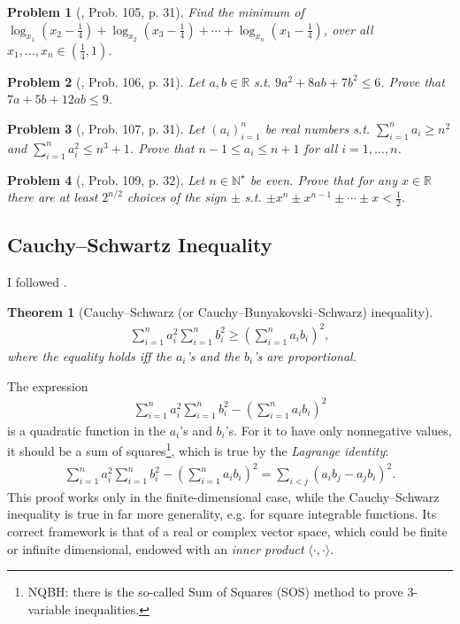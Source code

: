 \documentclass[oneside]{book}
\numberwithin{equation}{section}
\newtheorem{theorem}{Theorem}[section]
\newtheorem{problem}{Problem}[section]
\begin{document}
\begin{problem}[\cite{Gelca_Andreescu2017}, Prob. 105, p. 31]
	Find the minimum of $\log_{x_1}\left(x_2 - \frac{1}{4}\right) + \log_{x_2}\left(x_3 - \frac{1}{4}\right) + \cdots + \log_{x_n}\left(x_1 - \frac{1}{4}\right)$, over all $x_1,\ldots,x_n\in\left(\frac{1}{4},1\right)$.
\end{problem}

\begin{problem}[\cite{Gelca_Andreescu2017}, Prob. 106, p. 31]
	Let $a,b\in\mathbb{R}$ s.t. $9a^2 + 8ab + 7b^2\le 6$. Prove that $7a + 5b + 12ab\le 9$.
\end{problem}

\begin{problem}[\cite{Gelca_Andreescu2017}, Prob. 107, p. 31]
	Let $(a_i)_{i=1}^n$ be real numbers s.t. $\sum_{i=1}^n a_i\ge n^2$ and $\sum_{i=1}^n a_i^2\le n^3 + 1$. Prove that $n - 1\le a_i\le n + 1$ for all $i = 1,\ldots,n$.
\end{problem}

\begin{problem}[\cite{Gelca_Andreescu2017}, Prob. 109, p. 32]
	Let $n\in\mathbb{N}^\star$ be even. Prove that for any $x\in\mathbb{R}$ there are at least $2^{n/2}$ choices of the sign $\pm$ s.t. $\pm x^n\pm x^{n-1}\pm\cdots\pm x < \frac{1}{2}$.
\end{problem}

\subsection{Cauchy--Schwartz Inequality}
I followed \cite[Subsect. 2.1.3, p. 32]{Gelca_Andreescu2017}.

\begin{theorem}[Cauchy--Schwarz (or Cauchy--Bunyakovski--Schwarz) inequality]
	\begin{align}
		\boxed{\sum_{i=1}^n a_i^2\sum_{i=1}^n b_i^2\ge\left(\sum_{i=1}^n a_ib_i\right)^2,}
	\end{align}
	where the equality holds iff the $a_i$'s and the $b_i$'s are proportional.
\end{theorem}
The expression
\begin{align*}
	\sum_{i=1}^n a_i^2\sum_{i=1}^n b_i^2 - \left(\sum_{i=1}^n a_ib_i\right)^2
\end{align*}
is a quadratic function in the $a_i$'s and $b_i$'s. For it to have only nonnegative values, it should be a sum of squares\footnote{NQBH: there is the so-called Sum of Squares (SOS) method to prove 3-variable inequalities.}, which is true by the \textit{Lagrange identity}:
\begin{align*}
	\sum_{i=1}^n a_i^2\sum_{i=1}^n b_i^2 - \left(\sum_{i=1}^n a_ib_i\right)^2 = \sum_{i < j} (a_ib_j - a_jb_i)^2.
\end{align*}
This proof works only in the finite-dimensional case, while the Cauchy--Schwarz inequality is true in far more generality, e.g. for square integrable functions. Its correct framework is that of a real or complex vector space, which could be finite or infinite dimensional, endowed with an \textit{inner product} $\langle\cdot,\cdot\rangle$.
	
\end{document}
